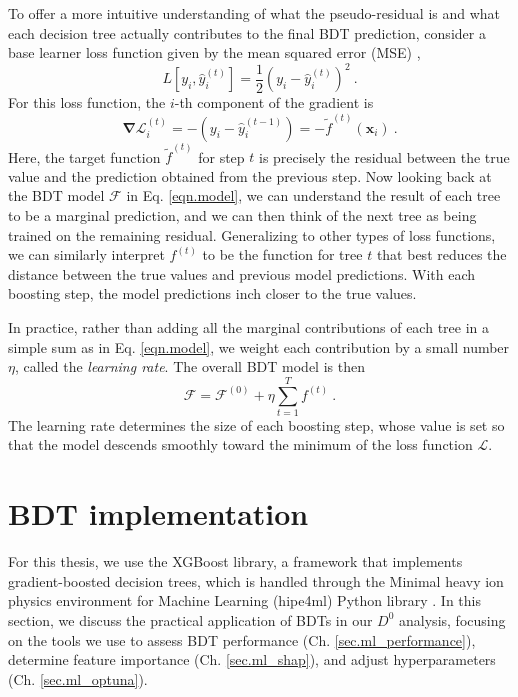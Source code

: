 To offer a more intuitive understanding of what the pseudo-residual is and what each decision tree actually contributes to the final BDT prediction, consider a base learner loss function given by the mean squared error (MSE) \cite{gradient_boosting},
\begin{equation}
    L[y_i, \hat{y}^{(t)}_i] = \frac{1}{2}(y_i- \hat{y}^{(t)}_i )^2 \ .
\end{equation}
For this loss function, the $i$-th component of the gradient is
\begin{equation}
    \mathbf{\nabla}\mathcal{L}_i^{(t)} = -(y_i- \hat{y}^{(t-1)}_i) = - \tilde{f}^{(t)}(\mathbf{x}_i) \ .
\end{equation}
Here, the target function $\tilde{f}^{(t)}$ for step $t$ is precisely the residual between the true value and the prediction obtained from the previous step. Now looking back at the BDT model $\mathcal{F}$ in Eq. \eqref{eqn.model}, we can understand the result of each tree to be a marginal prediction, and we can then think of the next tree as being trained on the remaining residual. Generalizing to other types of loss functions, we can similarly interpret $f^{(t)}$ to be the function for tree $t$ that best reduces the distance between the true values and previous model predictions. With each boosting step, the model predictions inch closer to the true values.

In practice, rather than adding all the marginal contributions of each tree in a simple sum as in Eq. \ref{eqn.model}, we weight each contribution by a small number $\eta$, called the {\it learning rate}. The overall BDT model is then \cite{friedman}
\begin{equation}
     \mathcal{F} = \mathcal{F}^{(0)} + \eta \sum_{t=1}^T f^{(t)} \ . \label{eqn.model_eta}
\end{equation}
The learning rate determines the size of each boosting step, whose value is set so that the model descends smoothly toward the minimum of the loss function $\mathcal{L}$.

\section{BDT implementation}
\label{sec.ml_implementation}
For this thesis, we use the XGBoost \cite{XGBoost} library, a framework that implements gradient-boosted decision trees, which is handled through the Minimal heavy ion physics environment for Machine Learning (hipe4ml) Python library \cite{hipe4ml}. In this section, we discuss the practical application of BDTs in our $D^0$ analysis, focusing on the tools we use to assess BDT performance (Ch. \ref{sec.ml_performance}), determine feature importance (Ch. \ref{sec.ml_shap}), and adjust hyperparameters (Ch. \ref{sec.ml_optuna}).

